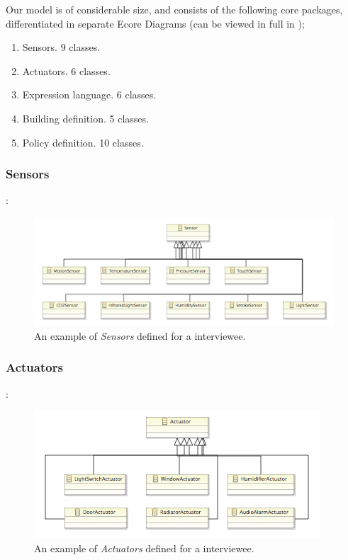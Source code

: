 \documentclass{llncs}
\begin{document}
Our model is of considerable size, and consists of the following core packages, differentiated in separate Ecore Diagrams (can be viewed in full in );

\begin{enumerate}
	\item Sensors. 9 classes.
	\item Actuators. 6 classes.
	\item Expression language. 6 classes.
	\item Building definition. 5 classes.
	\item Policy definition. 10 classes.
\end{enumerate}

\subsubsection{Sensors}:
\begin{figure}
	\centering
    \includegraphics[scale=0.7]{ecore-sensors.png} 
	\caption{An example of \textit{Sensors} defined for a interviewee.}
	\label{fig:ecore-sensors}
\end{figure}

\pagebreak
\subsubsection{Actuators}:
\begin{figure}
	\centering
    \includegraphics[scale=0.7]{ecore-actuators.png}   
	\caption{An example of \textit{Actuators} defined for a interviewee.}
	\label{fig:ecore-actuators}
\end{figure}
\end{document}
